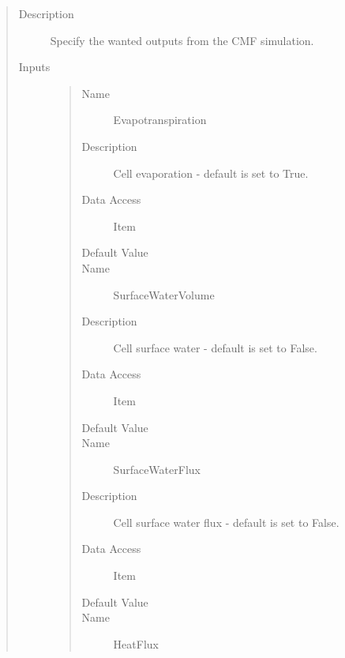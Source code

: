 \documentclass[letterpaper,10pt,english]{sphinxmanual}
\begin{document}
\begin{quote}\begin{description}
\item[{Description}] \leavevmode
Specify the wanted outputs from the CMF simulation.

\item[{Inputs}] \leavevmode\begin{quote}\begin{description}
\item[{Name}] \leavevmode
Evapotranspiration

\item[{Description}] \leavevmode
Cell evaporation - default is set to True.

\item[{Data Access}] \leavevmode
Item

\item[{Default Value}] \leavevmode
{}

\item[{Name}] \leavevmode
SurfaceWaterVolume

\item[{Description}] \leavevmode
Cell surface water - default is set to False.

\item[{Data Access}] \leavevmode
Item

\item[{Default Value}] \leavevmode
{}

\item[{Name}] \leavevmode
SurfaceWaterFlux

\item[{Description}] \leavevmode
Cell surface water flux - default is set to False.

\item[{Data Access}] \leavevmode
Item

\item[{Default Value}] \leavevmode
{}

\item[{Name}] \leavevmode
HeatFlux


\end{description}
\end{quote}
\end{description}
\end{quote}
\end{document}
